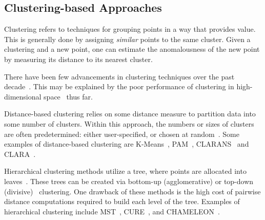 \subsection{Clustering-based Approaches}
\label{subsec:introduction:clustering-based-approaches}

Clustering refers to techniques for grouping points in a way that provides value.
This is generally done by assigning \textit{similar} points to the same cluster.
Given a clustering and a new point, one can estimate the anomalousness of the new point by measuring its distance to its nearest cluster.

There have been few advancements in clustering techniques over the past decade~\cite{wang2019progress}.
This may be explained by the poor performance of clustering in high-dimensional space~\cite{zhang2013advancements} thus far.

Distance-based clustering relies on some distance measure to partition data into some number of clusters.
Within this approach, the numbers or sizes of clusters are often predetermined: either user-specified, or chosen at random~\cite{wang2019progress}.
Some examples of distance-based clustering are
K-Means~\cite{macqueen1967some},
PAM~\cite{kaufman2009finding},
CLARANS~\cite{ng1994efficient} and
CLARA~\cite{kaufman2009finding}.

Hierarchical clustering methods utilize a tree, where points are allocated into leaves~\cite{wang2019progress}.
These trees can be created via bottom-up (agglomerative) or top-down (divisive)~\cite{agrawal1998automatic} clustering.
One drawback of these methods is the high cost of pairwise distance computations required to build each level of the tree.
Examples of hierarchical clustering include
MST~\cite{zahn1971graph},
CURE~\cite{guha1998cure}, and
CHAMELEON~\cite{karypis1999hierarchical}.

